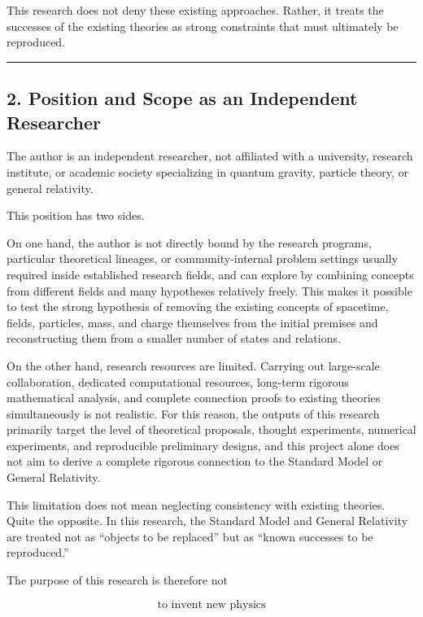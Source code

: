 \documentclass[
  a4paper,
]{article}
\begin{document}
This research does not deny these existing approaches. Rather, it treats
the successes of the existing theories as strong constraints that must
ultimately be reproduced.

\begin{center}\rule{0.5\linewidth}{0.5pt}\end{center}

\subsection{2. Position and Scope as an Independent
Researcher}\label{position-and-scope-as-an-independent-researcher}

The author is an independent researcher, not affiliated with a
university, research institute, or academic society specializing in
quantum gravity, particle theory, or general relativity.

This position has two sides.

On one hand, the author is not directly bound by the research programs,
particular theoretical lineages, or community-internal problem settings
usually required inside established research fields, and can explore by
combining concepts from different fields and many hypotheses relatively
freely. This makes it possible to test the strong hypothesis of removing
the existing concepts of spacetime, fields, particles, mass, and charge
themselves from the initial premises and reconstructing them from a
smaller number of states and relations.

On the other hand, research resources are limited. Carrying out
large-scale collaboration, dedicated computational resources, long-term
rigorous mathematical analysis, and complete connection proofs to
existing theories simultaneously is not realistic. For this reason, the
outputs of this research primarily target the level of theoretical
proposals, thought experiments, numerical experiments, and reproducible
preliminary designs, and this project alone does not aim to derive a
complete rigorous connection to the Standard Model or General
Relativity.

This limitation does not mean neglecting consistency with existing
theories. Quite the opposite. In this research, the Standard Model and
General Relativity are treated not as ``objects to be replaced'' but as
``known successes to be reproduced.''

The purpose of this research is therefore not

\[
\boxed{\text{to invent new physics}}
\]
\end{document}
